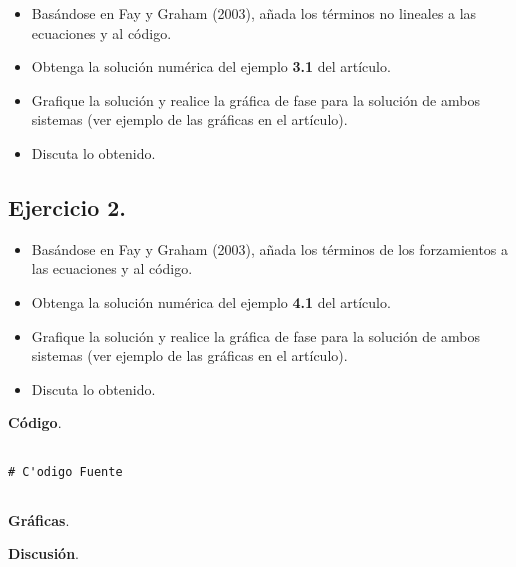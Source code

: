 \documentclass[11pt,letterpaper]{article}
\begin{document}
\begin{itemize}
\item Basándose en Fay y Graham (2003), añada los términos no lineales a las ecuaciones y al código.
\item Obtenga la solución numérica del ejemplo \textbf{3.1} del artículo.
\item Grafique la solución y realice la gráfica de fase para la solución de ambos sistemas (ver ejemplo de las gráficas en el artículo).
\item Discuta lo obtenido.
\end{itemize}

\subsection*{Ejercicio 2.}

\begin{itemize}
\item Basándose en Fay y Graham (2003), añada los términos de los forzamientos a las ecuaciones y al código.
\item Obtenga la solución numérica del ejemplo \textbf{4.1} del artículo.
\item Grafique la solución y realice la gráfica de fase para la solución de ambos sistemas (ver ejemplo de las gráficas en el artículo).
\item Discuta lo obtenido.
\end{itemize}
 
\newpage

\begin{tcolorbox}[colback=white]
\textbf{Código}.
\tcblower

\begin{lstlisting}

# C'odigo Fuente


\end{lstlisting}

\end{tcolorbox}


\begin{tcolorbox}[colback=white]
\textbf{Gráficas}.
\tcblower

\centering

\end{tcolorbox}

\begin{tcolorbox}[colback=white]
\textbf{Discusión}.
\tcblower


\end{tcolorbox}
\end{document}
